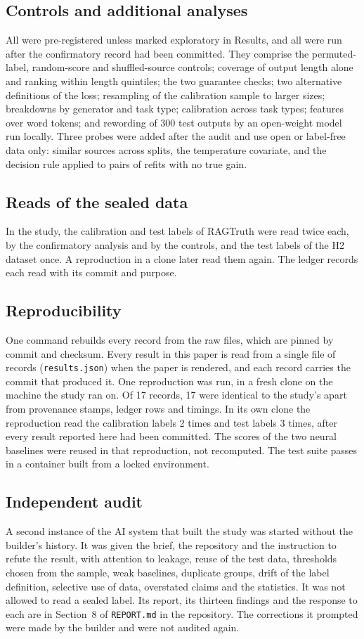 \documentclass[11pt]{article}
\begin{document}
\subsection*{Controls and additional analyses}
All were pre-registered unless marked exploratory in Results, and all were run after the confirmatory record had been committed. They comprise the permuted-label, random-score and shuffled-source controls; coverage of output length alone and ranking within length quintiles; the two guarantee checks; two alternative definitions of the loss; resampling of the calibration sample to larger sizes; breakdowns by generator and task type; calibration across task types; features over word tokens; and rewording of 300 test outputs by an open-weight model run locally. Three probes were added after the audit and use open or label-free data only: similar sources across splits, the temperature covariate, and the decision rule applied to pairs of refits with no true gain.

\subsection*{Reads of the sealed data}
In the study, the calibration and test labels of RAGTruth were read twice each, by the confirmatory analysis and by the controls, and the test labels of the H2 dataset once. A reproduction in a clone later read them again. The ledger records each read with its commit and purpose.

\subsection*{Reproducibility}
One command rebuilds every record from the raw files, which are pinned by commit and checksum. Every result in this paper is read from a single file of records (\texttt{results.json}) when the paper is rendered, and each record carries the commit that produced it. One reproduction was run, in a fresh clone on the machine the study ran on. Of 17 records, 17 were identical to the study's apart from provenance stamps, ledger rows and timings. In its own clone the reproduction read the calibration labels 2 times and test labels 3 times, after every result reported here had been committed. The scores of the two neural baselines were reused in that reproduction, not recomputed. The test suite passes in a container built from a locked environment.

\subsection*{Independent audit}
A second instance of the AI system that built the study was started without the builder's history. It was given the brief, the repository and the instruction to refute the result, with attention to leakage, reuse of the test data, thresholds chosen from the sample, weak baselines, duplicate groups, drift of the label definition, selective use of data, overstated claims and the statistics. It was not allowed to read a sealed label. Its report, its thirteen findings and the response to each are in Section~8 of \texttt{REPORT.md} in the repository. The corrections it prompted were made by the builder and were not audited again.
\end{document}
